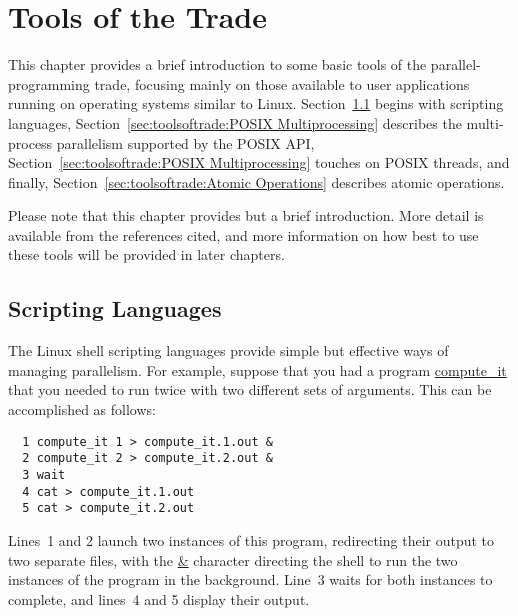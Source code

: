 
\chapter{Tools of the Trade}
\label{chp:Tools of the Trade}


This chapter provides a brief introduction to some basic tools of the
parallel-programming trade, focusing mainly on those available to
user applications running on operating systems similar to Linux.
Section~\ref{sec:toolsoftrade:Scripting Languages} begins with
scripting languages,
Section~\ref{sec:toolsoftrade:POSIX Multiprocessing}
describes the multi-process parallelism supported by the POSIX API,
Section~\ref{sec:toolsoftrade:POSIX Multiprocessing} touches on POSIX threads,
and finally,
Section~\ref{sec:toolsoftrade:Atomic Operations}
describes atomic operations.

Please note that this chapter provides but a brief introduction.
More detail is available from the references cited, and more information
on how best to use these tools will be provided in later chapters.

\section{Scripting Languages}
\label{sec:toolsoftrade:Scripting Languages}

The Linux shell scripting languages provide simple but effective ways
of managing parallelism.
For example, suppose that you had a program \url{compute_it}
that you needed to run twice with two different sets of arguments.
This can be accomplished as follows:

\vspace{5pt}
\begin{minipage}[t]{\columnwidth}
\begin{verbatim}
  1 compute_it 1 > compute_it.1.out &
  2 compute_it 2 > compute_it.2.out &
  3 wait
  4 cat > compute_it.1.out
  5 cat > compute_it.2.out
\end{verbatim}
\end{minipage}
\vspace{5pt}

Lines~1 and 2 launch two instances of this program, redirecting their
output to two separate files, with the \url{&} character directing the
shell to run the two instances of the program in the background.
Line~3 waits for both instances to complete, and lines~4 and 5
display their output.

